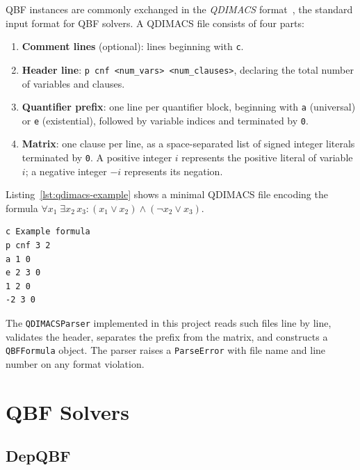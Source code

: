 QBF instances are commonly exchanged in the \emph{QDIMACS} format~\cite{QDIMACS}, the standard input format for QBF solvers. A QDIMACS file consists of four parts:

\begin{enumerate}
  \item \textbf{Comment lines} (optional): lines beginning with \texttt{c}.
  \item \textbf{Header line}: \texttt{p cnf <num\_vars> <num\_clauses>}, declaring the total number of variables and clauses.
  \item \textbf{Quantifier prefix}: one line per quantifier block, beginning with \texttt{a} (universal) or \texttt{e} (existential), followed by variable indices and terminated by \texttt{0}.
  \item \textbf{Matrix}: one clause per line, as a space-separated list of signed integer literals terminated by \texttt{0}. A positive integer $i$ represents the positive literal of variable $i$; a negative integer $-i$ represents its negation.
\end{enumerate}

Listing~\ref{lst:qdimacs-example} shows a minimal QDIMACS file encoding the formula $\forall x_1\; \exists x_2\, x_3 \colon (x_1 \lor x_2) \land (\lnot x_2 \lor x_3)$.

\begin{listing}[H]
\caption{A minimal QDIMACS example.}
\label{lst:qdimacs-example}
\begin{verbatim}
c Example formula
p cnf 3 2
a 1 0
e 2 3 0
1 2 0
-2 3 0
\end{verbatim}
\end{listing}

The \texttt{QDIMACSParser} implemented in this project reads such files line by line, validates the header, separates the prefix from the matrix, and constructs a \texttt{QBFFormula} object. The parser raises a \texttt{ParseError} with file name and line number on any format violation.

\section{QBF Solvers}\label{sec:solvers}

\subsection{DepQBF}\label{subsec:depqbf}

